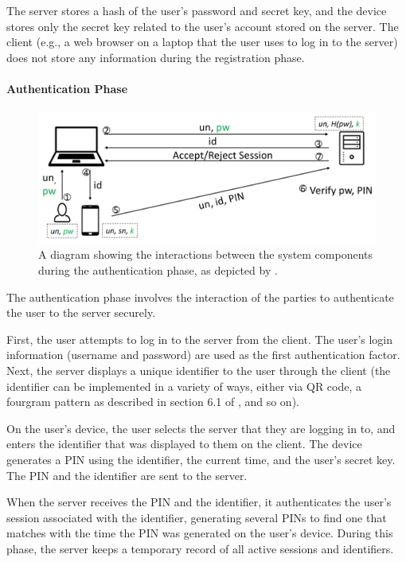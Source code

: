 \documentclass[11pt]{article}
\begin{document}
The server stores a hash of the user's password and secret key, and the
device stores only the secret key related to the user's account stored
on the server. The client (e.g., a web browser on a laptop that the user
uses to log in to the server) does not store any information during the
registration phase. 

\paragraph{Authentication Phase}

\begin{figure}
    \centering
    \includegraphics[scale=0.3]{auth.PNG}
    \caption{A diagram showing the interactions between the system
    components during the authentication phase, as depicted by
    \cite{shirvanian2d2fa}.}
\end{figure}

The authentication phase involves the interaction of the parties to
authenticate the user to the server securely. 

First, the user attempts to log in to the server from the client. The
user's login information (username and password) are used as the first
authentication factor. Next, the server displays a unique identifier to
the user through the client (the identifier can be implemented in a
variety of ways, either via QR code, a fourgram pattern as described in
section 6.1 of \cite{shirvanian2d2fa}, and so on). 

On the user's device, the user selects the server that they are logging
in to, and enters the identifier that was displayed to them on the
client. The device generates a PIN using the identifier, the current
time, and the user's secret key. The PIN and the identifier are sent to
the server.

When the server receives the PIN and the identifier, it authenticates
the user's session associated with the identifier, generating several
PINs to find one that matches with the time the PIN was generated on the
user's device. During this phase, the server keeps a temporary record of
all active sessions and identifiers.
\end{document}
